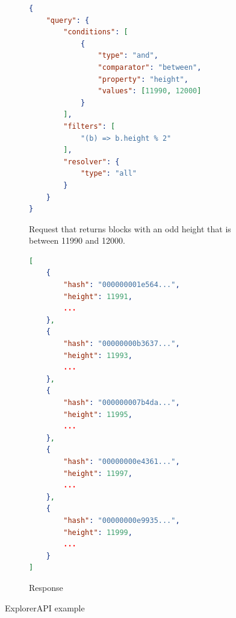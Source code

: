 \begin{figure}[h]
    \begin{subfigure}[t]{.5\textwidth}
        \begin{lstlisting}[language=json]
{
    "query": {
        "conditions": [
            {
                "type": "and",
                "comparator": "between",
                "property": "height",
                "values": [11990, 12000]
            }
        ],
        "filters": [
            "(b) => b.height % 2"
        ],
        "resolver": {
            "type": "all"
        }
    }
}
        \end{lstlisting}
        \caption{Request that returns blocks with an odd height that is between 11990 and 12000.}
        \label{explorerApiRequest}
    \end{subfigure}
    \begin{subfigure}[t]{.5\textwidth}
        \begin{lstlisting}[language=json]
[
    {
        "hash": "000000001e564...",
        "height": 11991,
        ...
    },
    {
        "hash": "00000000b3637...",
        "height": 11993,
        ...
    },
    {
        "hash": "000000007b4da...",
        "height": 11995,
        ...
    },
    {
        "hash": "00000000e4361...",
        "height": 11997,
        ...
    },
    {
        "hash": "00000000e9935...",
        "height": 11999,
        ...
    }
]
        \end{lstlisting}
        \caption{Response}
        \label{explorerApiResponse}
    \end{subfigure}
    \caption{ExplorerAPI example}
    \label{explorerApiExample}
\end{figure}

 



